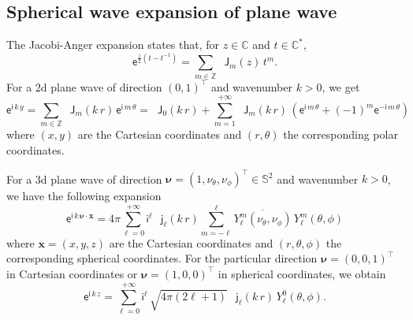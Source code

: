 \documentclass[12pt,a4paper]{article}
\theoremstyle{definition}
\theoremstyle{plain}
\theoremstyle{remark}
\newcommand{\bbC}{\mathbb{C}}
\newcommand{\bbS}{\mathbb{S}}
\newcommand{\bbZ}{\mathbb{Z}}
\newcommand{\ex}{\mathsf{e}}
\newcommand{\im}{\mathsf{i}}
\newcommand{\bJ}{\mathop{}\!\mathsf{J}}
\newcommand{\bj}{\mathop{}\!\mathsf{j}}
\newcommand{\plr}[1]{\left(#1\right)}
\newcommand{\vect}[1]{\boldsymbol{#1}}
\newcommand{\vx}{\boldsymbol{x}}
\begin{document}
\subsection{Spherical wave expansion of plane wave}\label{sec:plane_wave_expan}

The Jacobi-Anger expansion \cite[Eq.~10.12.1]{NIST:DLMF} states that, for \(z \in \bbC\) and \(t \in \bbC^*\),
\[
    \ex^{\frac{z}{2}(t-t^{-1})} = \sum_{m \in \bbZ} \bJ_m(z)\, t^m.
\]
For a 2d plane wave of direction \((0, 1)^\intercal\) and wavenumber \(k > 0\), we get
\begin{equation}\label{eq:wave_expan_2}
    \ex^{\im\, k\, y} = \sum_{m \in \bbZ} \bJ_m(k\, r)\, \ex^{\im\, m\, \theta}
    = \bJ_0(k\, r) + \sum_{m = 1}^{+\infty} \bJ_m(k\, r)\, \plr{\ex^{\im\, m\, \theta} + (-1)^m\ex^{-\im\, m\, \theta}}
\end{equation}
where \((x, y)\) are the Cartesian coordinates and \((r, \theta)\) the corresponding polar coordinates.

\bigskip

For a 3d plane wave of direction \(\vect{\nu} = (1, \nu_\theta, \nu_\phi)^\intercal \in \bbS^2\) and wavenumber \(k > 0\), we have the following expansion
\[
    \ex^{\im\, k\, \vect{\nu} \cdot \vx} = 4\pi \sum_{\ell = 0}^{+\infty} \im^\ell\, \bj_\ell(k\, r) \sum_{m = -\ell}^\ell \overline{Y_\ell^m(\nu_\theta, \nu_\phi)}\, Y_\ell^m(\theta, \phi)
\]
where \(\vx = (x, y, z)\) are the Cartesian coordinates and \((r, \theta, \phi)\) the corresponding spherical coordinates.
For the particular direction \(\vect{\nu} = (0, 0, 1)^\intercal\) in Cartesian coordinates or \(\vect{\nu} = (1, 0, 0)^\intercal\) in spherical coordinates, we obtain
\begin{equation}\label{eq:wave_expan_3}
    \ex^{\im\, k\, z} = \sum_{\ell = 0}^{+\infty} \im^\ell \,\sqrt{4\pi(2\ell+1)}\, \bj_\ell(k\, r)\, Y_\ell^0(\theta, \phi).
\end{equation}



\end{document}
